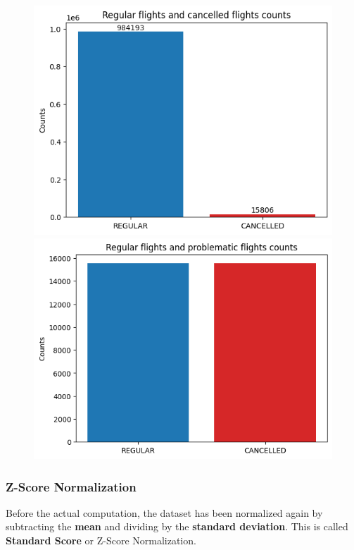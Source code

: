 \documentclass[
	letterpaper, %
	10pt, %
]{class}
\begin{document}
\begin{figure}[!htb]
    \centering
    \includegraphics[width=\linewidth]{../images/cancelled_unbalanced.png}
    \endminipage\hfill
    \includegraphics[width=\linewidth]{../images/cancelled_balanced.png}
    \endminipage\hfill
\end{figure}

\subsubsection{Z-Score Normalization}
Before the actual computation, the dataset has been normalized again by subtracting the \textbf{mean} and dividing by the \textbf{standard deviation}. This is called \textbf{Standard Score} \cite{normalization} or Z-Score Normalization.\\
\end{document}
